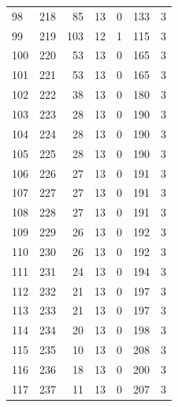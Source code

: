 \documentclass[a4paper,twoside,12pt]{book}
\begin{document}
\begin{appendices}
\begin{table}
\begin{tabular}{lrrrrrr}
		98  &    218 &        85 &        13 &               0 &             133 &         3 \\
		99  &    219 &       103 &        12 &               1 &             115 &         3 \\
		100 &    220 &        53 &        13 &               0 &             165 &         3 \\
		101 &    221 &        53 &        13 &               0 &             165 &         3 \\
		102 &    222 &        38 &        13 &               0 &             180 &         3 \\
		103 &    223 &        28 &        13 &               0 &             190 &         3 \\
		104 &    224 &        28 &        13 &               0 &             190 &         3 \\
		105 &    225 &        28 &        13 &               0 &             190 &         3 \\
		106 &    226 &        27 &        13 &               0 &             191 &         3 \\
		107 &    227 &        27 &        13 &               0 &             191 &         3 \\
		108 &    228 &        27 &        13 &               0 &             191 &         3 \\
		109 &    229 &        26 &        13 &               0 &             192 &         3 \\
		110 &    230 &        26 &        13 &               0 &             192 &         3 \\
		111 &    231 &        24 &        13 &               0 &             194 &         3 \\
		112 &    232 &        21 &        13 &               0 &             197 &         3 \\
		113 &    233 &        21 &        13 &               0 &             197 &         3 \\
		114 &    234 &        20 &        13 &               0 &             198 &         3 \\
		115 &    235 &        10 &        13 &               0 &             208 &         3 \\
		116 &    236 &        18 &        13 &               0 &             200 &         3 \\
		117 &    237 &        11 &        13 &               0 &             207 &         3 \\

\end{tabular}
\end{table}
\end{appendices}
\end{document}
